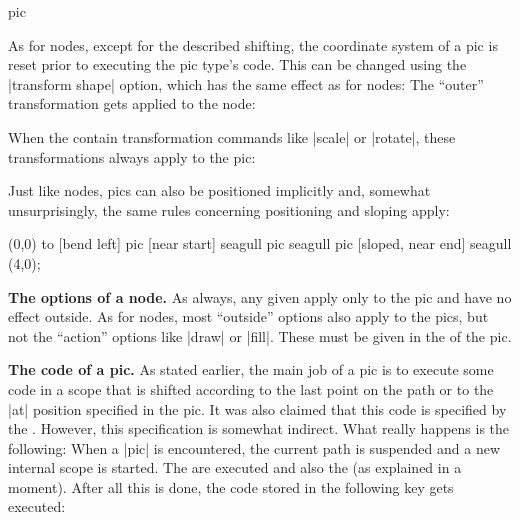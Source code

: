 \begin{pathoperation}{pic}{%
    }
\begin{codeexample}[]
\end{codeexample}

  As for nodes, except for the described shifting, the coordinate
  system of a pic is reset prior to executing the pic type's
  code. This can be changed using the |transform shape| option, which
  has the same effect as for nodes: The ``outer'' transformation gets
  applied to the node:
\begin{codeexample}[]
\end{codeexample}

  When the  contain transformation commands like |scale|
  or |rotate|, these transformations always apply to the pic:
\begin{codeexample}[]
\end{codeexample}

  Just like nodes, pics can also be positioned implicitly and,
  somewhat unsurprisingly, the same rules concerning positioning and
  sloping apply:
\begin{codeexample}[]
\tikz \draw
  (0,0) to [bend left] 
           pic [near start]       {seagull} 
           pic                    {seagull}
           pic [sloped, near end] {seagull} (4,0);
\end{codeexample}
  
  \medskip
  \textbf{The options of a node.}
  As always, any given  apply only to the pic and have
  no effect outside. As for nodes, most ``outside'' options also apply
  to the pics, but not the ``action'' options like |draw| or
  |fill|. These must be given in the  of the pic.

  \medskip
  \textbf{The code of a pic.}
  As stated earlier, the main job of a pic is to execute some code in
  a scope that is shifted according to the last point on the path or
  to the |at| position specified in the pic. It was also claimed that
  this code is specified by the . However, this
  specification is somewhat indirect. What really happens is the
  following: When a |pic| is encountered, the current path is
  suspended and a new internal scope is started. The 
  are executed and also the  (as explained
  in a moment). After all this is done, the code stored in the following key
  gets executed:


\end{pathoperation}
